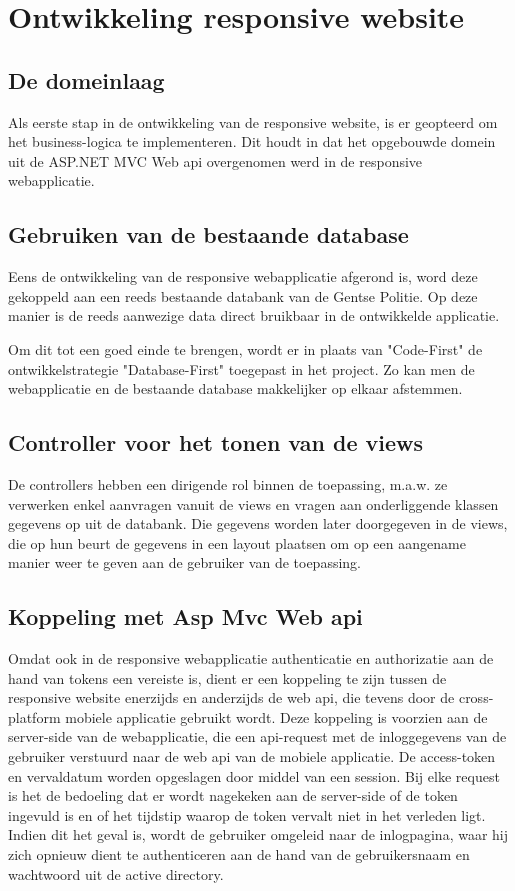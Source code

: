 \chapter{Ontwikkeling responsive website}
\label{ch:ontwikkelingresponsivewebsite}
\section{De domeinlaag}
Als eerste stap in de ontwikkeling van de responsive website, is er geopteerd om het business-logica te implementeren.
Dit houdt in dat het opgebouwde domein uit de ASP.NET MVC Web api overgenomen werd in de responsive webapplicatie.

\section{Gebruiken van de bestaande database}
Eens de ontwikkeling van de responsive webapplicatie afgerond is, word deze gekoppeld aan een reeds bestaande databank van de Gentse Politie.
Op deze manier is de reeds aanwezige data direct bruikbaar in de ontwikkelde applicatie.

Om dit tot een goed einde te brengen, wordt er in plaats van "Code-First" de ontwikkelstrategie "Database-First" toegepast in het project.
Zo kan men de webapplicatie en de bestaande database makkelijker op elkaar afstemmen.

\section{Controller voor het tonen van de views}
De controllers hebben een dirigende rol binnen de toepassing, m.a.w. ze verwerken enkel aanvragen vanuit de views en vragen aan onderliggende
klassen gegevens op uit de databank. Die gegevens worden later doorgegeven in de views, die op hun beurt de gegevens in een layout plaatsen om
op een aangename manier weer te geven aan de gebruiker van de toepassing.

\section{Koppeling met Asp Mvc Web api}
Omdat ook in de responsive webapplicatie authenticatie en authorizatie aan de hand van tokens een vereiste is,
dient er een koppeling te zijn tussen de responsive website enerzijds en anderzijds de web api, die tevens door de cross-platform
mobiele applicatie gebruikt wordt. Deze koppeling is voorzien aan de server-side van de webapplicatie, die een api-request met
de inloggegevens van de gebruiker verstuurd naar de web api van de mobiele applicatie. De access-token en vervaldatum worden
opgeslagen door middel van een session. Bij elke request is het de bedoeling dat er wordt nagekeken aan de server-side of
de token ingevuld is en of het tijdstip waarop de token vervalt niet in het verleden ligt. Indien dit het geval is, wordt
de gebruiker omgeleid naar de inlogpagina, waar hij zich opnieuw dient te authenticeren aan de hand van de gebruikersnaam en
wachtwoord uit de active directory.

